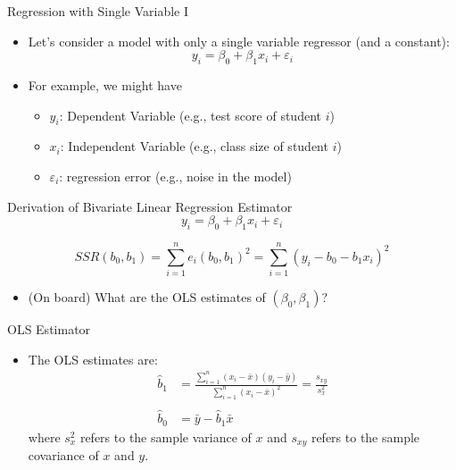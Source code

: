 \documentclass[aspectratio=169,11pt]{beamer}
\begin{document}
\begin{frame}{Regression with Single Variable I}
	\begin{itemize}
	
	\item Let's consider a model with only a single variable regressor (and a constant):\[
	y_i = \beta_0 + \beta_1 x_i + \varepsilon_i
	\]

	\medskip
	\item For example, we might have 
	\begin{itemize}
		\item $y_i$: Dependent Variable (e.g., test score of student $i$)
		\item $x_i$: Independent Variable (e.g., class size of student $i$)
		\item $\varepsilon_i$: regression error (e.g., noise in the model)
	\end{itemize}

	\end{itemize}
\end{frame}




\begin{frame}{Derivation of Bivariate Linear Regression Estimator}
\[
	y_i = \beta_0 + \beta_1 x_i + \varepsilon_i
	\]

\[
		SSR\left(b_0,b_1\right) = \sum_{i=1}^{n} e_i \left(b_0,b_1\right)^2  =  \sum_{i=1}^{n} \left(y_i - b_{0} - b_{1} x_{i}\right)^{2} 
	\]


	\begin{itemize}
		\item (On board) What are the OLS estimates of $\left(\beta_0,\beta_1\right)$?
	\end{itemize}
\end{frame}

\begin{frame}{OLS Estimator}
	\begin{itemize}
\item The OLS estimates are:
\begin{align*}
\hat{b}_1 &=\frac{\sum\limits_{i=1}^n(x_i-\bar{x})(y_i-\bar{y})}{\sum\limits_{i=1}^n(x_i-\bar{x})^2}=\frac{s_{xy}}{s_{x}^{2}} \\
\\
\hat{b}_0 & = \bar{y} - \hat{b}_1 \bar{x}
\end{align*}
where $s_{x}^{2}$ refers to the sample variance of $x$ and $s_{xy}$ refers to the sample covariance of $x$ and $y$.

	\end{itemize}
\end{frame}
\end{document}
